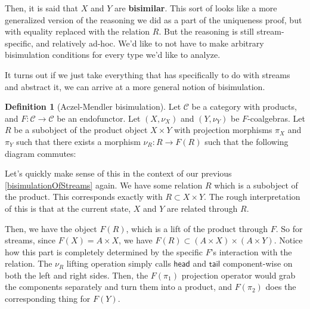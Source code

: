 \documentclass{article}
\theoremstyle{plain}
\theoremstyle{definition}
\newtheorem{definition}{Definition}
\begin{document}
Then, it is said that \ensuremath{X} and \ensuremath{Y} are \textbf{bisimilar}. This sort of looks like a more generalized version of the reasoning we did as a part of the uniqueness proof, but with equality replaced with the relation \ensuremath{R}. But the reasoning is still stream-specific, and relatively ad-hoc. We'd like to not have to make arbitrary bisimulation conditions for every type we'd like to analyze.

It turns out if we just take everything that has specifically to do with streams and abstract it, we can arrive at a more general notion of bisimulation.

\begin{definition}[Aczel-Mendler bisimulation]
 Let \ensuremath{\mathcal{C}} be a category with products, and \ensuremath{F : \mathcal{C} \rightarrow \mathcal{C}} be an endofunctor. Let \ensuremath{\left( X, {\nu }_{X} \right)} and \ensuremath{\left( Y, {\nu }_{Y} \right)} be \ensuremath{F}-coalgebras. Let \ensuremath{R} be a subobject of the product object \ensuremath{X \times Y} with projection morphisms \ensuremath{{\pi }_{X}} and \ensuremath{{\pi }_{Y}} such that there exists a morphism \ensuremath{{\nu }_{R} : R \rightarrow F\left( R \right)} such that the following diagram commutes:

 
\begin{center}
\end{center}
 
\end{definition}
\label{genericBisimulation} 

Let's quickly make sense of this in the context of our previous \ref{bisimulationOfStreams} again. We have some relation \ensuremath{R} which is a subobject of the product. This corresponds exactly with \ensuremath{R \subset X \times Y}. The rough interpretation of this is that at the current state, \ensuremath{X} and \ensuremath{Y} are related through \ensuremath{R}.

Then, we have the object \ensuremath{F\left( R \right)}, which is a lift of the product through \ensuremath{F}. So for streams, since \ensuremath{F\left( X \right) = A \times X}, we have \ensuremath{F\left( R \right) \subset \left( A \times X \right) \times \left( A \times Y \right)}. Notice how this part is completely determined by the specific \ensuremath{F}'s interaction with the relation. The \ensuremath{{\nu }_{R}} lifting operation simply calls \ensuremath{\mathsf{head}} and \ensuremath{\mathsf{tail}} component-wise on both the left and right sides. Then, the \ensuremath{F\left( {\pi }_{1} \right)} projection operator would grab the components separately and turn them into a product, and \ensuremath{F\left( {\pi }_{2} \right)} does the corresponding thing for \ensuremath{F\left( Y \right)}.
\end{document}
